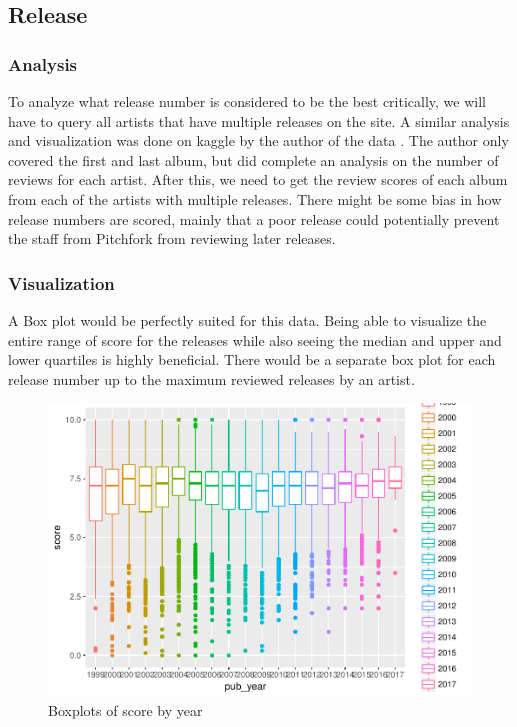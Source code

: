 \documentclass{article}
\begin{document}
\subsection{Release}\label{release}

\subsubsection{Analysis}\label{analysis}

To analyze what release number is considered to be the best critically,
we will have to query all artists that have multiple releases on the
site. A similar analysis and visualization was done on kaggle by the
author of the data \citep{kaggleFirst}. The author only covered the
first and last album, but did complete an analysis on the number of
reviews for each artist. After this, we need to get the review scores of
each album from each of the artists with multiple releases. There might
be some bias in how release numbers are scored, mainly that a poor
release could potentially prevent the staff from Pitchfork from
reviewing later releases.

\subsubsection{Visualization}\label{visualization-1}

A Box plot would be perfectly suited for this data. Being able to
visualize the entire range of score for the releases while also seeing
the median and upper and lower quartiles is highly beneficial. There
would be a separate box plot for each release number up to the maximum
reviewed releases by an artist.

\newpage

\newpage

\begin{figure}
\centering
\includegraphics{report_files/figure-latex/score_year.pdf}
\caption{Boxplots of score by year \label{fig1}}
\end{figure}
\end{document}
